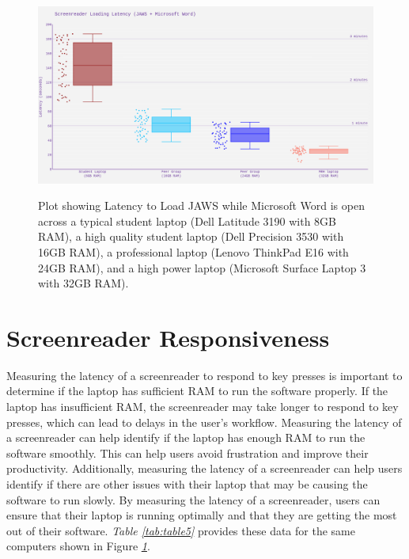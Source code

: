 \begin{figure}[H]
\centering
\includegraphics[width=\textwidth, alt={Boxplot of Screenreader loading latency for laptops with different amounts of RAM. A laptop with 8GB RAM took 143 seconds to load, 16GB took 64GB to load, 24GB RAM took 49 seconds to load, and 32GB RAM took 25 seconds to load}]{images/ComputerRBDisplaySpecsTVIFig1.png}
\caption[Latency to Load JAWS]{Plot showing Latency to Load JAWS while Microsoft Word is open across a typical student laptop (Dell Latitude 3190 with 8GB RAM), a high quality student laptop (Dell Precision 3530 with 16GB RAM), a professional laptop (Lenovo ThinkPad E16 with 24GB RAM), and a high power laptop (Microsoft Surface Laptop 3 with 32GB RAM).}\label{fig:figure1}
\end{figure}

\pagebreak
\hypertarget{screenreader-response}{}\section{Screenreader Responsiveness}\label{screenreader-response}
Measuring the latency of a screenreader to respond to key presses is important to determine if the laptop has sufficient RAM to run the software properly. If the laptop has insufficient RAM, the screenreader may take longer to respond to key presses, which can lead to delays in the user’s workflow. Measuring the latency of a screenreader can help identify if the laptop has enough RAM to run the software smoothly. This can help users avoid frustration and improve their productivity. Additionally, measuring the latency of a screenreader can help users identify if there are other issues with their laptop that may be causing the software to run slowly. By measuring the latency of a screenreader, users can ensure that their laptop is running optimally and that they are getting the most out of their software. \textit{Table \ref{tab:table5}} provides these data for the same computers shown in Figure \textit{\ref{fig:figure1}}.

